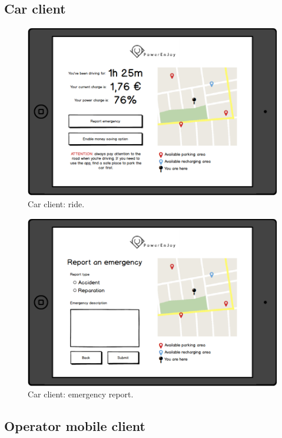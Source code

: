 \subsection{Car client}

	\begin{figure}[h]
		\includegraphics[height=0.4\textheight, center]{img/user_interface_design/Car_ride.png}
		\caption{Car client: ride.}
	\end{figure}
	\begin{figure}[h]
		\includegraphics[height=0.4\textheight, center]{img/user_interface_design/Car_emergency_report.png}
		\caption{Car client: emergency report.}
	\end{figure}

\subsection{Operator mobile client}

